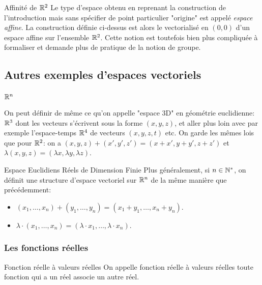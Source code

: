 \documentclass{classe}
\begin{document}
\begin{remarque}{Affinité de $\mathbb{R}^{2}$}{}
	Le type d'espace obtenu en reprenant la construction de l'introduction mais sans spécifier de point particulier "origine" est appelé \emph{espace affine}.
	La construction définie ci-dessus est alors le vectorialisé en $\left(0, 0\right)$ d'un espace affine sur l'ensemble $\mathbb{R}^{2}$.
	Cette notion est toutefois bien plus compliquée à formaliser et demande plus de pratique de la notion de groupe.
\end{remarque}

\subsection{Autres exemples d'espaces vectoriels}

\subsubsection{$\mathbb{R}^n$}

On peut définir de même ce qu'on appelle "espace 3D" en géométrie euclidienne: $\mathbb{R}^3$ dont les vecteurs s'écrivent sous la forme $(x, y, z)$, et aller plus loin avec par exemple l'espace-temps $\mathbb{R}^4$ de vecteurs $(x, y, z, t)$ etc. On garde les mêmes lois que pour $\mathbb{R}^2$: on a $(x, y, z) + (x', y', z') = (x+x', y+y', z+z')$ et $\lambda(x, y, z) = (\lambda x, \lambda y, \lambda z)$.

\begin{définition}{Espace Euclidiens Réels de Dimension Finie}{}
	Plus généralement, si $n \in \mathbb{N}^{*}$, on définit une structure d'espace vectoriel sur $\mathbb{R}^{n}$ de la même manière que précédemment:
	\begin{itemize}
		\item $\left( x_{1}, \ldots, x_{n} \right) + \left( y_{1}, \ldots, y_{n} \right) = \left( x_{1} + y_{1}, \ldots, x_{n} + y_{n} \right)$.
		\item $\lambda \cdot \left( x_{1}, \ldots, x_{n} \right) = \left( \lambda \cdot x_{1}, \ldots, \lambda \cdot x_{n} \right)$.
	\end{itemize}
\end{définition}

\subsubsection{Les fonctions réelles}

\begin{définition}{Fonction réelle à valeurs réelles}{}
On appelle fonction réelle à valeurs réelles toute fonction qui a un réel associe un autre réel.
\end{définition}
\end{document}
